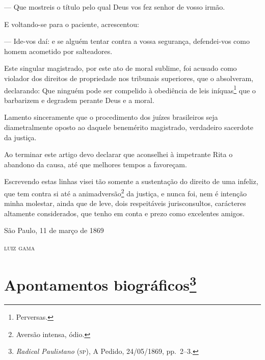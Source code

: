 --- Que mostreis o título pelo qual Deus vos fez senhor de vosso irmão.

E voltando-se para o paciente, acrescentou:

--- Ide-vos daí: e se alguém tentar contra a vossa segurança,
defendei-vos como homem acometido por salteadores.

Este singular magistrado, por este ato de moral sublime, foi acusado
como violador dos direitos de propriedade nos tribunais superiores, que
o absolveram, declarando: Que ninguém pode ser compelido à obediência de
leis iníquas\footnote{Perversas.} que o barbarizem e degradem perante
Deus e a moral.

Lamento sinceramente que o procedimento dos juízes brasileiros seja
diametralmente oposto ao daquele benemérito magistrado, verdadeiro
sacerdote da justiça.

Ao terminar este artigo devo declarar que aconselhei à impetrante Rita o
abandono da causa, até que melhores tempos a favoreçam.

Escrevendo estas linhas visei tão somente a sustentação do direito de
uma infeliz, que tem contra si até a animadversão\footnote{Aversão
  intensa, ódio.} da justiça, e nunca foi, nem é intenção minha
molestar, ainda que de leve, dois respeitáveis jurisconsultos,
carácteres altamente considerados, que tenho em conta e prezo como
excelentes amigos.

\begin{flushright}
São Paulo, 11 de março de 1869

\textsc{luiz gama}
\end{flushright}

\chapter{Apontamentos biográficos\footnote{\emph{Radical Paulistano}
  (\textsc{sp}), A Pedido, 24/05/1869, pp.~2--3.}}

